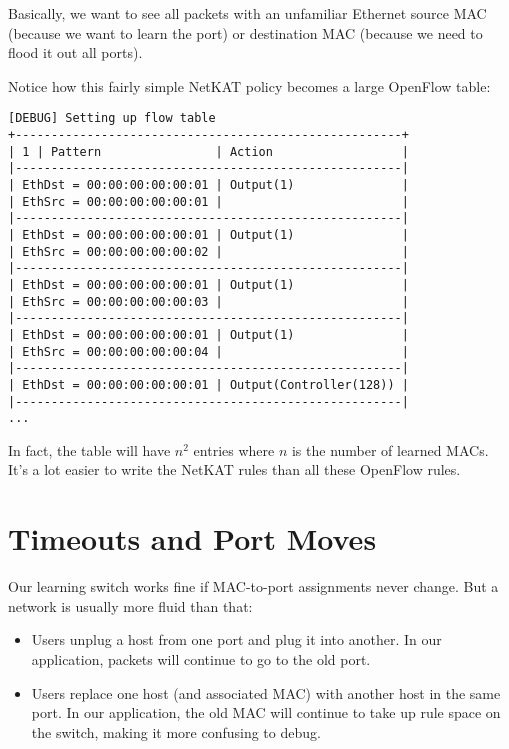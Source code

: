 Basically, we want to see all packets with an unfamiliar Ethernet source MAC (because we want to learn the
port) or destination MAC (because we need to flood it out all ports).  

Notice how this fairly simple NetKAT policy becomes a large OpenFlow table:

\begin{verbatim}
[DEBUG] Setting up flow table
+------------------------------------------------------+
| 1 | Pattern                | Action                  |
|------------------------------------------------------|
| EthDst = 00:00:00:00:00:01 | Output(1)               |
| EthSrc = 00:00:00:00:00:01 |                         |
|------------------------------------------------------|
| EthDst = 00:00:00:00:00:01 | Output(1)               |
| EthSrc = 00:00:00:00:00:02 |                         |
|------------------------------------------------------|
| EthDst = 00:00:00:00:00:01 | Output(1)               |
| EthSrc = 00:00:00:00:00:03 |                         |
|------------------------------------------------------|
| EthDst = 00:00:00:00:00:01 | Output(1)               |
| EthSrc = 00:00:00:00:00:04 |                         |
|------------------------------------------------------|
| EthDst = 00:00:00:00:00:01 | Output(Controller(128)) |
|------------------------------------------------------|
...
\end{verbatim}

In fact, the table will have $n^2$ entries where $n$ is the number of learned MACs.  It's a lot easier
to write the NetKAT rules than all these OpenFlow rules.  

\section{Timeouts and Port Moves}
\label{l2_learning_switch:timeouts}

Our learning switch works fine if MAC-to-port assignments never change.  But a network is usually
more fluid than that:

\begin{itemize}
\item Users unplug a host from one port and plug it into another.  In our application, packets will
continue to go to the old port.
\item Users replace one host (and associated MAC) with another host in the same port.  In our application, the
old MAC will continue to take up rule space on the switch, making it more confusing to debug. 
\end{itemize}

